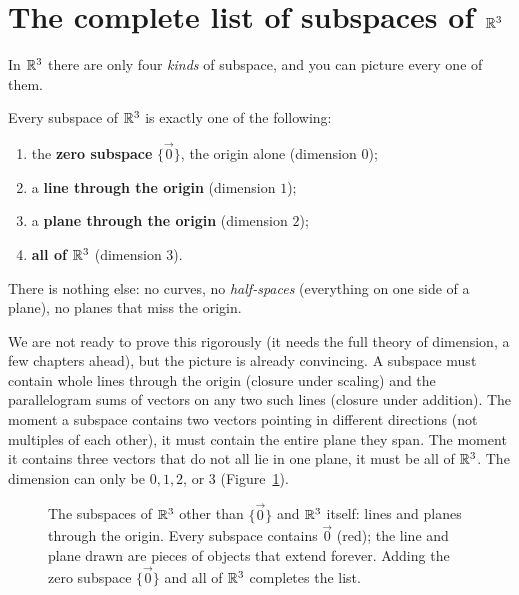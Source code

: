 \section{The complete list of subspaces of $\mathbb{R}^3$}

In $\mathbb{R}^3$ there are only four \emph{kinds} of subspace, and you
can picture every one of them.

\begin{theorem}\label{ch11:r3-subspaces}
Every subspace of $\mathbb{R}^3$ is exactly one of the following:
\begin{enumerate}[label=(\roman*)]
  \item the \textbf{zero subspace} $\{\vec{0}\}$, the origin alone (dimension $0$);
  \item a \textbf{line through the origin} (dimension $1$);
  \item a \textbf{plane through the origin} (dimension $2$);
  \item \textbf{all of $\mathbb{R}^3$} (dimension $3$).
\end{enumerate}
There is nothing else: no curves, no \emph{half-spaces} (everything on one side of a
plane), no planes that miss the origin.
\end{theorem}

We are not ready to prove this rigorously (it needs the full theory of dimension, a few
chapters ahead), but the picture is already convincing. A subspace must contain whole lines
through the origin (closure under scaling) and the parallelogram sums of vectors on any
two such lines (closure under addition). The moment a subspace contains two vectors
pointing in different directions (not multiples of each other), it must contain the
entire plane they span. The moment it contains three vectors that do not all lie in one
plane, it must be all of $\mathbb{R}^3$.
The dimension can only be $0,1,2$, or $3$ (Figure~\ref{ch11:fig-r3subs}).

\begin{figure}[htbp]
\centering
{}
\caption{The subspaces of $\mathbb{R}^3$ other than $\{\vec{0}\}$ and $\mathbb{R}^3$ itself: lines and
planes through the origin. Every subspace contains $\vec{0}$ (red); the line and plane
drawn are pieces of objects that extend forever. Adding the zero subspace $\{\vec{0}\}$
and all of $\mathbb{R}^3$ completes the list.}
\label{ch11:fig-r3subs}
\end{figure}

